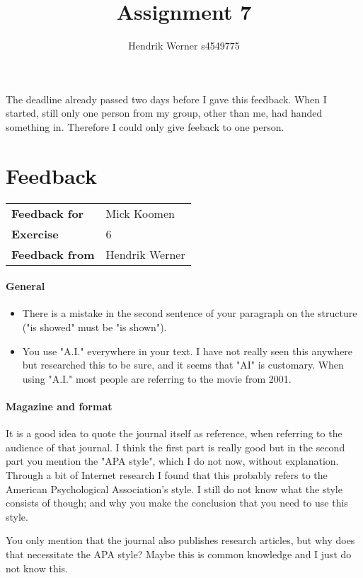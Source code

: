 \documentclass[12pt, a4paper]{article}
\title{Assignment 7}
\author{Hendrik Werner s4549775}
\begin{document}
\maketitle

The deadline already passed two days before I gave this feedback. When I started, still only one person from my group, other than me, had handed something in. Therefore I could only give feeback to one person.

\clearpage
\section*{Feedback}
\begin{tabular}{l l}
	\textbf{Feedback for} & Mick Koomen\\
	\textbf{Exercise} & 6\\
	\textbf{Feedback from} & Hendrik Werner\\
\end{tabular}

\paragraph{General}
\begin{itemize}
	\item There is a mistake in the second sentence of your paragraph on the structure ("is showed" must be "is shown").
	\item You use "A.I." everywhere in your text. I have not really seen this anywhere but researched this to be sure, and it seems that "AI" is customary. When using "A.I." most people are referring to the movie from 2001.
\end{itemize}

\paragraph{Magazine and format}
It is a good idea to quote the journal itself as reference, when referring to the audience of that journal. I think the first part is really good but in the second part you mention the "APA style", which I do not now, without explanation. Through a bit of Internet research I found that this probably refers to the American Psychological Association's style. I still do not know what the style consists of though; and why you make the conclusion that you need to use this style.

You only mention that the journal also publishes research articles, but why does that necessitate the APA style? Maybe this is common knowledge and I just do not know this.
\end{document}

